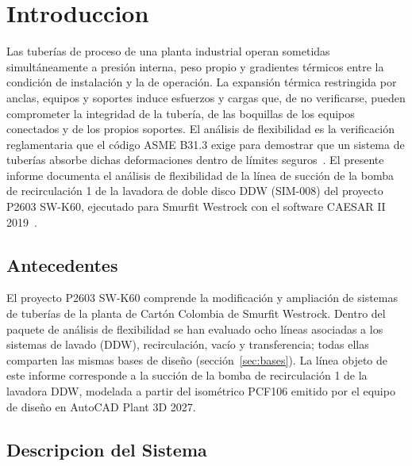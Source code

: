 \section{Introduccion}
\label{sec:intro}

Las tuber\'{i}as de proceso de una planta industrial operan sometidas
simult\'{a}neamente a presi\'{o}n interna, peso propio y gradientes t\'{e}rmicos
entre la condici\'{o}n de instalaci\'{o}n y la de operaci\'{o}n. La expansi\'{o}n
t\'{e}rmica restringida por anclas, equipos y soportes induce esfuerzos y cargas
que, de no verificarse, pueden comprometer la integridad de la tuber\'{i}a, de las
boquillas de los equipos conectados y de los propios soportes. El an\'{a}lisis de
flexibilidad es la verificaci\'{o}n reglamentaria que el c\'{o}digo ASME B31.3
exige para demostrar que un sistema de tuber\'{i}as absorbe dichas deformaciones
dentro de l\'{i}mites seguros~\cite{asme_b313_2016}. El presente informe documenta
el an\'{a}lisis de flexibilidad de la l\'{i}nea de succi\'{o}n de la bomba de
recirculaci\'{o}n 1 de la lavadora de doble disco DDW (SIM-008) del proyecto
P2603 SW-K60, ejecutado para Smurfit Westrock con el software CAESAR II
2019~\cite{caesar2_ug_2019}.

\subsection{Antecedentes}

El proyecto P2603 SW-K60 comprende la modificaci\'{o}n y ampliaci\'{o}n de
sistemas de tuber\'{i}as de la planta de Cart\'{o}n Colombia de Smurfit Westrock.
Dentro del paquete de an\'{a}lisis de flexibilidad se han evaluado ocho
l\'{i}neas asociadas a los sistemas de lavado (DDW), recirculaci\'{o}n, vac\'{i}o
y transferencia; todas ellas comparten las mismas bases de dise\~{n}o
(secci\'{o}n~\ref{sec:bases}). La l\'{i}nea objeto de este informe corresponde a
la succi\'{o}n de la bomba de recirculaci\'{o}n 1 de la lavadora DDW, modelada a
partir del isom\'{e}trico PCF106 emitido por el equipo de dise\~{n}o en AutoCAD
Plant 3D 2027.

\subsection{Descripcion del Sistema}

